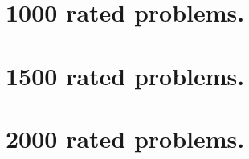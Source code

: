 \documentclass{book}
\begin{document}

 

\tableofcontents
\newpage

\chapter{1000 rated problems.}
\chapter{1500 rated problems.}
\chapter{2000 rated problems.}
 
\end{document}
